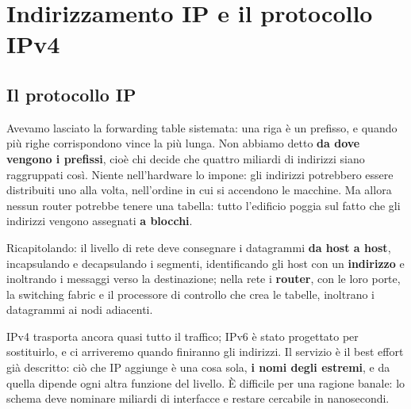 \chapter{Indirizzamento IP e il protocollo IPv4}

\section{Il protocollo IP}

Avevamo lasciato la forwarding table sistemata: una riga è un prefisso, e quando più righe corrispondono vince la più
lunga. Non abbiamo detto \textbf{da dove vengono i prefissi}, cioè chi decide che quattro miliardi di indirizzi siano
raggruppati così. Niente nell'hardware lo impone: gli indirizzi potrebbero essere distribuiti uno alla volta, nell'ordine
in cui si accendono le macchine. Ma allora nessun router potrebbe tenere una tabella: tutto l'edificio poggia sul fatto
che gli indirizzi vengono assegnati \textbf{a blocchi}.

Ricapitolando: il livello di rete deve consegnare i datagrammi \textbf{da host a host}, incapsulando e
decapsulando i segmenti, identificando gli host con un \textbf{indirizzo} e inoltrando i messaggi verso la
destinazione; nella rete i \textbf{router}, con le loro porte, la switching fabric e il processore di controllo che
crea le tabelle, inoltrano i datagrammi ai nodi adiacenti.


IPv4 trasporta ancora quasi tutto il traffico; IPv6 è stato progettato per sostituirlo, e ci arriveremo quando finiranno gli
indirizzi. Il servizio è il best effort già descritto: ciò che IP aggiunge è una cosa sola, \textbf{i nomi degli estremi},
e da quella dipende ogni altra funzione del livello. È difficile per una ragione banale: lo schema deve nominare miliardi di
interfacce e restare cercabile in nanosecondi.

